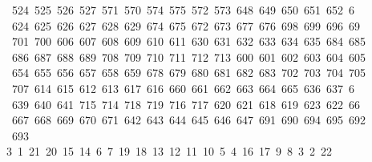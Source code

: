 \begin{tabbing}
\ 524\ 525\ 526\ 527\ 571\ 570\ 574\ 575\ 572\ 573\ 648\ 649\ 650\ 651\ 652\ 6\\[0pt]
\ 624\ 625\ 626\ 627\ 628\ 629\ 674\ 675\ 672\ 673\ 677\ 676\ 698\ 699\ 696\ 69\\[0pt]
\ 701\ 700\ 606\ 607\ 608\ 609\ 610\ 611\ 630\ 631\ 632\ 633\ 634\ 635\ 684\ 685\\[0pt]
\>\ 686\ 687\ 688\ 689\ 708\ 709\ 710\ 711\ 712\ 713\ 600\ 601\ 602\ 603\ 604\ 605\\[0pt]
\>\ 654\ 655\ 656\ 657\ 658\ 659\ 678\ 679\ 680\ 681\ 682\ 683\ 702\ 703\ 704\ 705\ \\[0pt]
\ 707\ 614\ 615\ 612\ 613\ 617\ 616\ 660\ 661\ 662\ 663\ 664\ 665\ 636\ 637\ 6\\[0pt]
\ 639\ 640\ 641\ 715\ 714\ 718\ 719\ 716\ 717\ 620\ 621\ 618\ 619\ 623\ 622\ 66\\[0pt]
\ 667\ 668\ 669\ 670\ 671\ 642\ 643\ 644\ 645\ 646\ 647\ 691\ 690\ 694\ 695\ 692\\[0pt]
\>\ 693\ \\[0pt]
3\ 1\ 21\ 20\ 15\ 14\ 6\ 7\ 19\ 18\ 13\ 12\ 11\ 10\ 5\ 4\ 16\ 17\ 9\ 8\ 3\ 2\ 22\\[0pt]

\end{tabbing}
